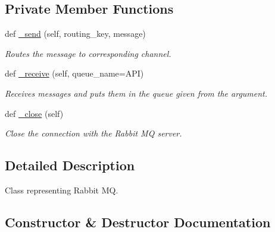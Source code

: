 \subsection*{Private Member Functions}
\begin{DoxyCompactItemize}
\item 
def \hyperlink{classtwitter_1_1wrappers_1_1rabbitmq__wrapper_1_1Rabbitmq_aff19e59d7fd9025f21972e331a1fdfde}{\+\_\+send} (self, routing\+\_\+key, message)
\begin{DoxyCompactList}\small\item\em Routes the message to corresponding channel. \end{DoxyCompactList}\item 
def \hyperlink{classtwitter_1_1wrappers_1_1rabbitmq__wrapper_1_1Rabbitmq_a430a4af33557422e4a0575323b6d7027}{\+\_\+receive} (self, queue\+\_\+name=\textquotesingle{}A\+PI\textquotesingle{})
\begin{DoxyCompactList}\small\item\em Receives messages and puts them in the queue given from the argument. \end{DoxyCompactList}\item 
\mbox{\label{classtwitter_1_1wrappers_1_1rabbitmq__wrapper_1_1Rabbitmq_aeb0b7d3eee2a07ca9b795924e2af584c}} 
def \hyperlink{classtwitter_1_1wrappers_1_1rabbitmq__wrapper_1_1Rabbitmq_aeb0b7d3eee2a07ca9b795924e2af584c}{\+\_\+close} (self)
\begin{DoxyCompactList}\small\item\em Close the connection with the Rabbit MQ server. \end{DoxyCompactList}\end{DoxyCompactItemize}


\subsection{Detailed Description}
Class representing Rabbit MQ. 

\subsection{Constructor \& Destructor Documentation}
\mbox{\label{classtwitter_1_1wrappers_1_1rabbitmq__wrapper_1_1Rabbitmq_a62d86eb0c3c5f086500ef0097f9efd65}} 
